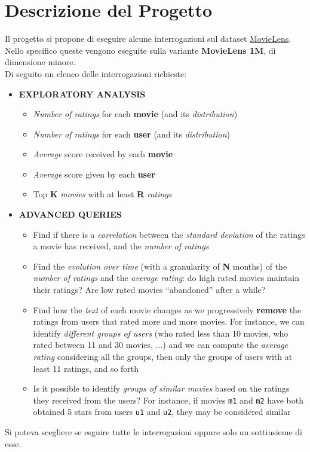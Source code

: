 \documentclass{article}
\begin{document}
    \section{Descrizione del Progetto}
        Il progetto si propone di eseguire alcune interrogazioni sul dataset \href{https://grouplens.org/datasets/movielens/}{MovieLens}. Nello specifico queste vengono eseguite sulla variante \textbf{MovieLens 1M}, di dimensione minore.\\
        Di seguito un elenco delle interrogazioni richieste:
        \begin{itemize}
            \item \textbf{EXPLORATORY ANALYSIS}
                  \begin{itemize}
                    \item \textit{Number of ratings} for each \textbf{movie} (and its \textit{distribution})
                    \item \textit{Number of ratings} for each \textbf{user} (and its \textit{distribution})
                    \item \textit{Average} score received by each \textbf{movie}
                    \item \textit{Average} score given by each \textbf{user}
                    \item Top \textbf{K} \textit{movies} with at least \textbf{R} \textit{ratings}
                  \end{itemize}
            \item \textbf{ADVANCED QUERIES}
                  \begin{itemize}
                    \item Find if there is a \textit{correlation} between the \textit{standard deviation} of the ratings a movie has received, and the \textit{number of ratings}
                    \item Find the \textit{evolution over time} (with a granularity of \textbf{N} months) of the \textit{number of ratings} and the \textit{average rating}: do high rated movies maintain their ratings? Are low rated movies “abandoned” after a while?
                    \item Find how the \textit{text} of each movie changes as we progressively \textbf{remove} the ratings from users that rated more and more movies. For instance, we can identify \textit{different groups of users} (who rated less than 10 movies, who rated between 11 and 30 movies, ...) and we can compute the \textit{average rating} considering all the groups, then only the groups of users with at least 11 ratings, and so forth
                    \item Is it possible to identify \textit{groups of similar movies} based on the ratings they received from the users? For instance, if movies \texttt{m1} and \texttt{m2} have both obtained 5 stars from users \texttt{u1} and \texttt{u2}, they may be considered similar
                  \end{itemize}
        \end{itemize}
        Si poteva scegliere se esguire tutte le interrogazioni oppure solo un sottinsieme di esse.
\end{document}
